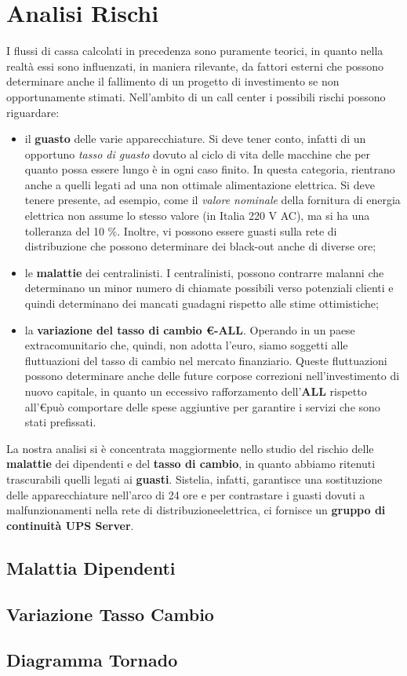 \chapter[Analisi Rischi]{Analisi Rischi}
I flussi di cassa calcolati in precedenza sono puramente teorici, in quanto nella realtà essi sono influenzati, in maniera rilevante, da fattori esterni che possono determinare anche il fallimento di un progetto di investimento se non opportunamente stimati.
Nell'ambito di un call center i possibili rischi possono riguardare:
\begin{itemize}
\item il \textbf{guasto} delle varie apparecchiature. Si deve tener conto, infatti di un opportuno \textit{tasso di guasto} dovuto al ciclo di vita delle macchine che per quanto possa essere lungo è in ogni caso finito. In questa categoria, rientrano anche a quelli legati ad una non ottimale alimentazione elettrica. Si deve tenere presente, ad esempio, come il \textit{valore nominale} della fornitura di energia elettrica non assume lo stesso valore (in Italia 220 V AC), ma si ha una tolleranza del 10 \%\cite{norma_cei}. Inoltre, vi possono essere guasti sulla rete di distribuzione che possono determinare dei black-out anche di diverse ore;
\item le \textbf{malattie} dei centralinisti. I centralinisti, possono contrarre malanni che determinano un minor numero di chiamate possibili verso potenziali clienti e quindi determinano dei mancati guadagni rispetto alle stime ottimistiche;
\item la \textbf{variazione del tasso di cambio \euro -ALL}. Operando in un paese extracomunitario che, quindi, non adotta l'euro, siamo soggetti alle fluttuazioni del tasso di cambio nel mercato finanziario. Queste fluttuazioni possono determinare anche delle future corpose correzioni nell'investimento di nuovo capitale, in quanto un eccessivo rafforzamento dell'\textbf{ALL} rispetto all'\euro può comportare delle spese aggiuntive per garantire i servizi che sono stati prefissati.  
\end{itemize} 
La nostra analisi si è concentrata maggiormente nello studio del rischio delle \textbf{malattie} dei dipendenti e del \textbf{tasso di cambio}, in quanto abbiamo ritenuti trascurabili quelli legati ai \textbf{guasti}. Sistelia, infatti, garantisce una sostituzione delle apparecchiature nell'arco di 24 ore e per contrastare i guasti dovuti a malfunzionamenti nella rete di distribuzioneelettrica, ci fornisce un \textbf{gruppo di continuità \ac{UPS} Server}.

\section[Malattia Dipendenti]{Malattia Dipendenti}
	

\section[Variazione Tasso Cambio]{Variazione Tasso Cambio}
	
	
\section[Diagramma Tornado]{Diagramma Tornado}	
	